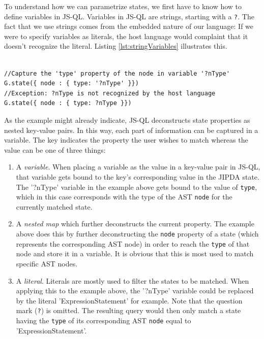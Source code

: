 To understand how we can parametrize states, we first have to know how to define variables in JS-QL. Variables in JS-QL are strings, starting with a \texttt{?}. The fact that we use strings comes from the embedded nature of our language: If we were to specify variables as literals, the host language would complaint that it doesn't recognize the literal. Listing \ref{lst:stringVariables} illustrates this.

\begin{lstlisting}[label={lst:stringVariables},language=JSQL,caption=Defining variables in JS-QL,mathescape=true]  % float=t?

//Capture the 'type' property of the node in variable '?nType'
G.state({ node : { type: '?nType' }})
//Exception: ?nType is not recognized by the host language
G.state({ node : { type: ?nType }}) 
\end{lstlisting}

As the example might already indicate, JS-QL deconstructs state properties as nested key-value pairs. In this way, each part of information can be captured in a variable. The key indicates the property the user wishes to match whereas the value can be one of three things:
\begin{enumerate}
\item A \textit{variable}. When placing a variable as the value in a key-value pair in JS-QL, that variable gets bound to the key's corresponding value in the JIPDA state. The '?nType' variable in the example above gets bound to the value of \texttt{type}, which in this case corresponds with the type of the AST \texttt{node} for the currently matched state.
\item A \textit{nested map} which further deconstructs the current property. The example above does this by further deconstructing the \texttt{node} property of a state (which represents the corresponding AST node) in order to reach the \texttt{type} of that node and store it in a variable. It is obvious that this is most used to match specific AST nodes.
\item A \textit{literal}. Literals are mostly used to filter the states to be matched. When applying this to the example above, the '?nType' variable could be replaced by the literal 'ExpressionStatement' for example. Note that the question mark (\texttt{?}) is omitted. The resulting query would then only match a state having the \texttt{type} of its corresponding AST \texttt{node} equal to 'ExpressionStatement'.
\end{enumerate}

